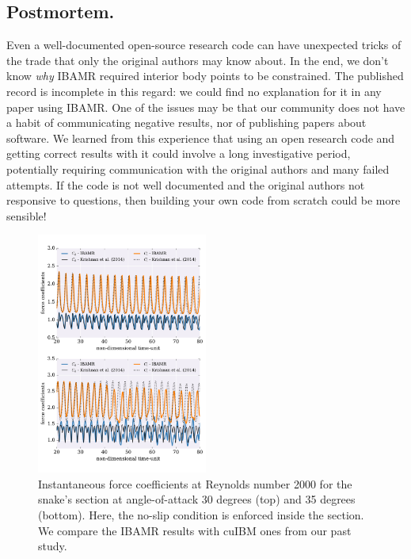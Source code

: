\documentclass[9pt,twocolumn,twoside]{article}
\begin{document}
\subsection*{Postmortem.} 
Even a well-documented open-source research code can have unexpected tricks of the trade that only the original authors may know about. 
In the end, we don't know \textit{why} IBAMR required interior body points to be constrained. 
The published record is incomplete in this regard: we could find no explanation for it in any paper using IBAMR. 
One of the issues may be that our community does not have a habit of communicating negative results, nor of publishing papers about software. 
We learned from this experience that using an open research code and getting correct results with it could involve a long investigative period, potentially requiring communication with the original authors and many failed attempts. 
If the code is not well documented and the original authors not responsive to questions, then building your own code from scratch could be more sensible!





\begin{figure}[t]
\centering
\includegraphics[width=0.5\textwidth]{./figures/ibamr/ibamr_forceCoefficientsRe2000.pdf}
\caption{
Instantaneous force coefficients at Reynolds number 2000 for the snake's section at angle-of-attack 30 degrees (top) and 35 degrees (bottom).
Here, the no-slip condition is enforced inside the section.
We compare the IBAMR results with cuIBM ones from our past study.}
\label{figure7}
\end{figure}
\end{document}
